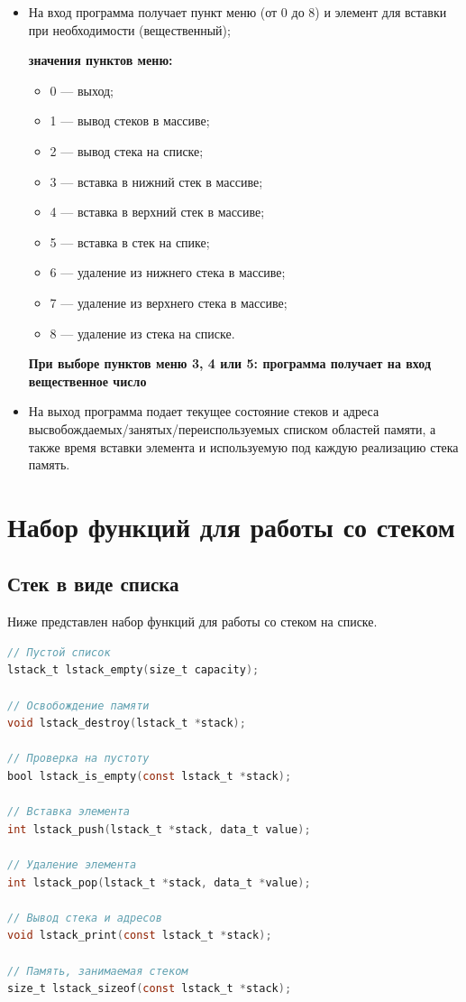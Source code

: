 \begin{itemize}[$\bullet$]
	\item На вход программа получает пункт меню (от 0 до 8) и элемент для вставки при необходимости (вещественный);
	
	\textbf{значения пунктов меню: }
	\begin{itemize}
		\item 0 --- выход;
		\item 1 --- вывод стеков в массиве;
		\item 2 --- вывод стека на списке;
		\item 3 --- вставка в нижний стек в массиве;
		\item 4 --- вставка в верхний стек в массиве;
		\item 5 --- вставка в стек на спике;
		\item 6 --- удаление из нижнего стека в массиве;
		\item 7 --- удаление из верхнего стека в массиве;
		\item 8 --- удаление из стека на списке.
	\end{itemize}

	\textbf{При выборе пунктов меню 3, 4 или 5: программа получает на вход вещественное число}
	\item На выход программа подает текущее состояние стеков и адреса высвобождаемых/занятых/переиспользуемых списком областей памяти, а также время вставки элемента и используемую под каждую реализацию стека память.
\end{itemize}

\section{Набор функций для работы со стеком}

\subsection{Стек в виде списка}

Ниже представлен набор функций для работы со стеком на списке.

\begin{lstlisting}[language=C,caption=Набор функций для стека-списка.]
// Пустой список
lstack_t lstack_empty(size_t capacity);

// Освобождение памяти
void lstack_destroy(lstack_t *stack);

// Проверка на пустоту
bool lstack_is_empty(const lstack_t *stack);

// Вставка элемента
int lstack_push(lstack_t *stack, data_t value);

// Удаление элемента
int lstack_pop(lstack_t *stack, data_t *value);

// Вывод стека и адресов
void lstack_print(const lstack_t *stack);

// Память, занимаемая стеком
size_t lstack_sizeof(const lstack_t *stack);
\end{lstlisting}

